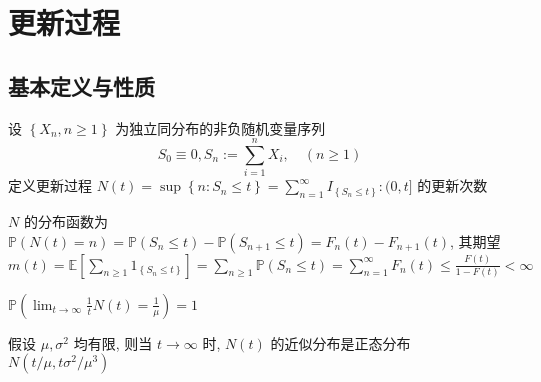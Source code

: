 \documentclass[10pt]{yerbaformat}
\begin{document}
\section{更新过程}
\subsection{基本定义与性质}
\begin{definition}
    设 $\left\{X_{n}, n \geq 1\right\}$ 为独立同分布的非负随机变量序列
    $$
        S_{0} \equiv 0, S_{n}:=\sum_{i=1}^{n} X_{i}, \quad(n \geq 1)
    $$
    定义更新过程 $N(t)=\sup \left\{n: S_{n} \leq t\right\}=\sum_{n=1}^{\infty} I_{\left\{S_{n} \leq t\right\}}:(0, t]$ 的更新次数
\end{definition}

\par $N$ 的分布函数为 $\mathbb{P}(N(t)=n)=\mathbb{P}\left(S_{n} \leq t\right)-\mathbb{P}\left(S_{n+1} \leq t\right)=F_{n}(t)-F_{n+1}(t)$, 其期望 $m(t)=\mathbb{E}\left[\sum_{n \geq 1} 1_{\left\{S_{n} \leq t\right\}}\right]=\sum_{n \geq 1} \mathbb{P}\left(S_{n} \leq t\right)=\sum_{n=1}^{\infty} F_{n}(t)\leq \frac{F(t)}{1-F(t)}<\infty$

\begin{theorem}
    $\mathbb{P}\left(\lim _{t \rightarrow \infty} \frac{1}{t} N(t)=\frac{1}{\mu}\right)=1$
\end{theorem}

\begin{theorem}
    假设 $\mu, \sigma^{2}$ 均有限, 则当 $t \rightarrow \infty$ 时, $N(t)$ 的近似分布是正态分布 $ N\left(t / \mu, t \sigma^{2} / \mu^{3}\right) $
\end{theorem}
\end{document}
